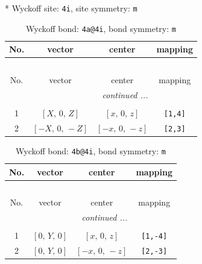 \documentclass[fleqn,8pt]{jsarticle}
\begin{document}
* Wyckoff site: {\tt 4i}, site symmetry: {\tt m}
\renewcommand{\arraystretch}{1.2}
\begin{longtable}{cccc}
\caption{Wyckoff bond: {\tt 4a@4i}, bond symmetry: {\tt m}}
 \\
 \hline \hline
No. & vector & center & mapping \\ \hline \endfirsthead

\multicolumn{3}{l}{\tablename\ \thetable{}} \\
 \hline \hline
No. & vector & center & mapping \\ \hline \endhead

 \hline \hline
\multicolumn{3}{r}{\footnotesize\it continued ...} \\ \endfoot

 \hline \hline
\multicolumn{3}{r}{} \\ \endlastfoot

1 & $\left[ X,\, 0,\, Z \right]$ & $\left[ x,\, 0,\, z \right]$ & {\tt [1,4]} \\ \hline
2 & $\left[ - X,\, 0,\, - Z \right]$ & $\left[ - x,\, 0,\, - z \right]$ & {\tt [2,3]} \\
\end{longtable}
\renewcommand{\arraystretch}{1.2}
\begin{longtable}{cccc}
\caption{Wyckoff bond: {\tt 4b@4i}, bond symmetry: {\tt m}}
 \\
 \hline \hline
No. & vector & center & mapping \\ \hline \endfirsthead

\multicolumn{3}{l}{\tablename\ \thetable{}} \\
 \hline \hline
No. & vector & center & mapping \\ \hline \endhead

 \hline \hline
\multicolumn{3}{r}{\footnotesize\it continued ...} \\ \endfoot

 \hline \hline
\multicolumn{3}{r}{} \\ \endlastfoot

1 & $\left[ 0,\, Y,\, 0 \right]$ & $\left[ x,\, 0,\, z \right]$ & {\tt [1,-4]} \\ \hline
2 & $\left[ 0,\, Y,\, 0 \right]$ & $\left[ - x,\, 0,\, - z \right]$ & {\tt [2,-3]} \\
\end{longtable}
\renewcommand{\arraystretch}{1.2}
\end{document}
